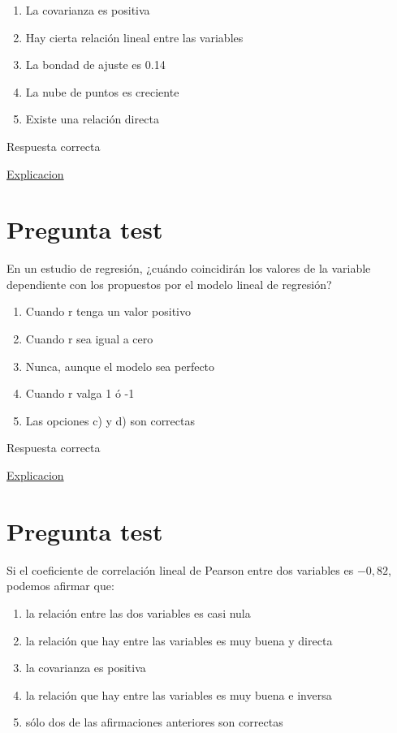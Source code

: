 \documentclass[
]{book}
\providecommand{\tightlist}{%
  \setlength{\itemsep}{0pt}\setlength{\parskip}{0pt}}
\begin{document}
\begin{enumerate}
\def\labelenumi{\alph{enumi})}
\tightlist
\item
  La covarianza es positiva
\item
  Hay cierta relación lineal entre las variables
\item
  La bondad de ajuste es 0.14
\item
  La nube de puntos es creciente
\item
  Existe una relación directa
\end{enumerate}

Respuesta correcta

\href{https://blog.minitab.com/es/analisis-de-regresion-como-puedo-interpretar-el-r-cuadrado-y-evaluar-la-bondad-de-ajuste}{Explicacion}

\hypertarget{pregunta-test-142}{%
\section{Pregunta test}\label{pregunta-test-142}}

En un estudio de regresión, ¿cuándo coincidirán los valores de la variable dependiente con los propuestos por el modelo lineal de regresión?

\begin{enumerate}
\def\labelenumi{\alph{enumi})}
\tightlist
\item
  Cuando r tenga un valor positivo
\item
  Cuando r sea igual a cero
\item
  Nunca, aunque el modelo sea perfecto
\item
  Cuando r valga 1 ó -1
\item
  Las opciones c) y d) son correctas
\end{enumerate}

Respuesta correcta

\href{https://1fjmanzano.github.io/bioestadistica/relaci\%C3\%B3n-entre-variables-nume\%CC\%81ricas.html\#coeficiente-de-correlacio\%CC\%81n}{Explicacion}

\hypertarget{pregunta-test-143}{%
\section{Pregunta test}\label{pregunta-test-143}}

Si el coeficiente de correlación lineal de Pearson entre dos variables es \(-0,82\), podemos afirmar que:

\begin{enumerate}
\def\labelenumi{\alph{enumi})}
\tightlist
\item
  la relación entre las dos variables es casi nula
\item
  la relación que hay entre las variables es muy buena y directa
\item
  la covarianza es positiva
\item
  la relación que hay entre las variables es muy buena e inversa
\item
  sólo dos de las afirmaciones anteriores son correctas
\end{enumerate}
\end{document}
